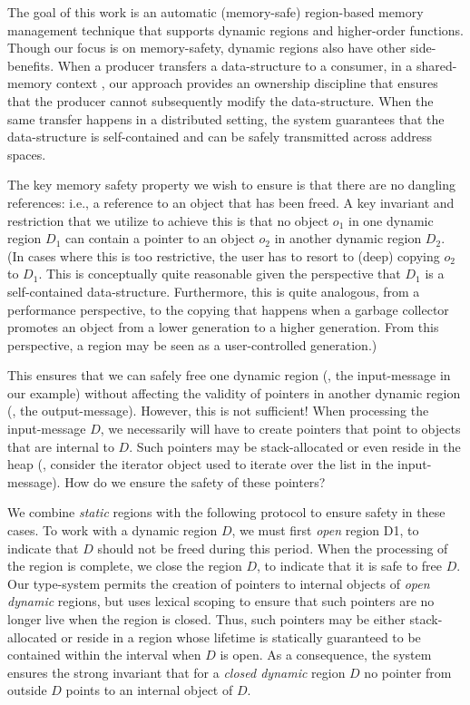 The goal of this work is an automatic (memory-safe) region-based memory management technique
that supports dynamic regions and higher-order functions.
Though our focus is on memory-safety, dynamic regions also have other side-benefits.
When a producer transfers a data-structure to a consumer, in a shared-memory context , our approach
provides an ownership discipline that ensures that the producer cannot subsequently modify
the data-structure. When the same transfer happens in a distributed setting, the system guarantees
that the data-structure is self-contained and can be safely transmitted across address spaces.

The key memory safety property we wish to ensure is that there are no dangling references:
i.e., a reference to an object that has been freed.
A key invariant and restriction that we utilize to achieve this is that no object $o_1$ in one dynamic
region $D_1$ can contain a pointer to an object $o_2$ in another dynamic region $D_2$.
(In cases where this is too restrictive, the user has to resort to (deep) copying $o_2$ to $D_1$.
This is conceptually quite reasonable given the perspective that $D_1$ is a self-contained data-structure.
Furthermore, this is quite analogous, from a performance perspective, to the copying that happens
when a garbage collector promotes an object from a lower generation to a higher generation.
From this perspective, a region may be seen as a user-controlled generation.)

This ensures that we can safely free one dynamic region (\eg, the input-message in our example)
without affecting the validity of pointers in another dynamic region (\eg, the output-message).
However, this is not sufficient! When processing the input-message $D$, we necessarily will have to create
pointers that point to objects that are internal to $D$. Such pointers may be stack-allocated or even reside
in the heap (\eg, consider the iterator object used to iterate over the list in the input-message).
How do we ensure the safety of these pointers?

We combine \emph{static} regions with the following protocol to ensure safety in these cases.
To work with a dynamic region $D$, we must first \emph{open} region D1,
to indicate that $D$ should not be freed during this period.
When the processing of the region is complete, we close the region $D$,
to indicate that it is safe to free $D$.
Our type-system permits the creation of pointers to internal objects of \emph{open dynamic} regions,
but uses lexical scoping to ensure that such pointers are no longer live when the region is closed.
Thus, such pointers may be either stack-allocated or reside in a region whose lifetime is statically
guaranteed to be contained within the interval when $D$ is open.
As a consequence, the system ensures the strong invariant that for a \emph{closed dynamic} region $D$
no pointer from outside $D$ points to an internal object of $D$.


